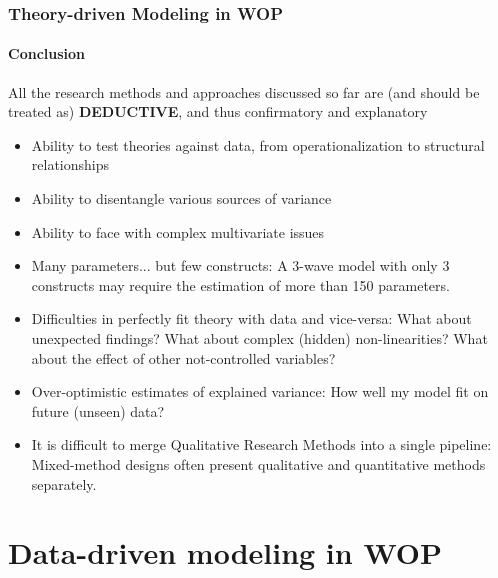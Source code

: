 \documentclass{beamer}
\begin{document}
\begin{frame}
	\frametitle{Theory-driven Modeling in WOP}
	\framesubtitle{Conclusion}
	
	{\scriptsize All the research methods and approaches discussed so far are (and should be treated as) \textbf{DEDUCTIVE}, and thus confirmatory and explanatory
		
    \color{green}{Advantages}
		\begin{itemize}
			\item Ability to test theories against data, from operationalization to structural relationships
			\item Ability to disentangle various sources of variance
			\item Ability to face with complex multivariate issues
		\end{itemize}
	
	\color{red}{Disadvantages}
		\begin{itemize}
			\item Many parameters... but few constructs: {\tiny A 3-wave model with only 3 constructs may require the estimation of more than 150 parameters.}
			\item Difficulties in perfectly fit theory with data and vice-versa: {\tiny What about unexpected findings? What about complex (hidden) non-linearities? What about the effect of other not-controlled variables?}
			\item Over-optimistic estimates of explained variance: {\tiny How well my model fit on future (unseen) data?}
			\item It is difficult to merge Qualitative Research Methods into a single pipeline: {\tiny Mixed-method designs often present qualitative and quantitative methods separately.}
		\end{itemize}}	
\end{frame}




\section{Data-driven modeling in WOP}
\end{document}
